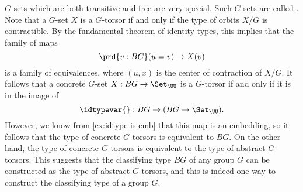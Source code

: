 $G$-sets which are both transitive and free are very special. Such $G$-sets are called . Note that a $G$-set $X$ is a $G$-torsor if and only if the type of orbits $X/G$ is contractible. By the fundamental theorem of identity types, this implies that the family of maps
\begin{equation*}
  \prd{v:BG}(u=v)\to X(v)
\end{equation*}
is a family of equivalences, where $(u,x)$ is the center of contraction of $X/G$. It follows that a concrete $G$-set $X:BG\to\Set_\UU$ is a $G$-torsor if and only if it is in the image of
\begin{equation*}
  \idtypevar{} : BG\to (BG\to \Set_\UU).
\end{equation*}
However, we know from \cref{ex:idtype-is-emb} that this map is an embedding, so it follows that the type of concrete $G$-torsors is equivalent to $BG$. On the other hand, the type of concrete $G$-torsors is equivalent to the type of abstract $G$-torsors. This suggests that the classifying type $BG$ of any group $G$ can be constructed as the type of abstract $G$-torsors, and this is indeed one way to construct the classifying type of a group $G$.

